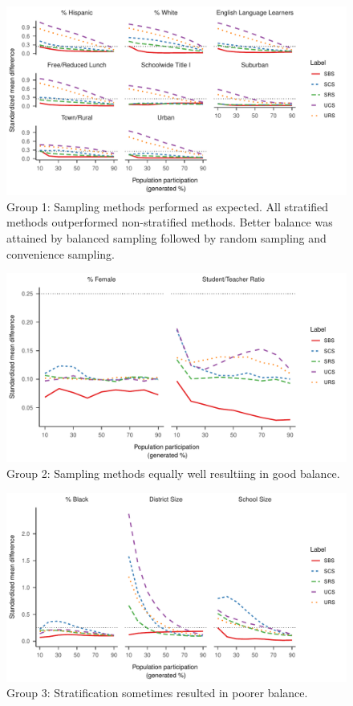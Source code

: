 \documentclass[english,man,floatsintext]{apa6}
\begin{document}
\begin{figure}
\centering
\includegraphics{6---Paper_files/figure-latex/fig-smd-group1-1.pdf}
\caption{\label{fig:fig-smd-group1}Group 1: Sampling methods performed as expected. All stratified methods outperformed non-stratified methods. Better balance was attained by balanced sampling followed by random sampling and convenience sampling.}
\end{figure}



\begin{figure}
\centering
\includegraphics{6---Paper_files/figure-latex/fig-smd-group2-1.pdf}
\caption{\label{fig:fig-smd-group2}Group 2: Sampling methods equally well resultiing in good balance.}
\end{figure}



\begin{figure}
\centering
\includegraphics{6---Paper_files/figure-latex/fig-smd-group3-1.pdf}
\caption{\label{fig:fig-smd-group3}Group 3: Stratification sometimes resulted in poorer balance.}
\end{figure}
\end{document}
